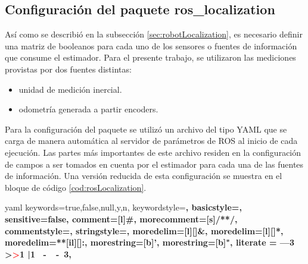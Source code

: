 \subsection{Configuración del paquete ros\_localization}

Así como se describió en la subsección \ref{sec:robotLocalization}, es necesario definir una matriz de booleanos para cada uno de los sensores o fuentes de información que consume el estimador. Para el presente trabajo, se utilizaron las mediciones provistas por dos fuentes distintas:

\begin{itemize}
  \item unidad de medición inercial.
  \item odometría generada a partir encoders.
\end{itemize}

Para la configuración del paquete se utilizó un archivo del tipo YAML que se carga de manera automática al servidor de parámetros de ROS al inicio de cada ejecución. Las partes más importantes de este archivo residen en la configuración de campos a ser tomados en cuenta por el estimador para cada una de las fuentes de información. Una versión reducida de esta configuración se muestra en el bloque de código \ref{cod:rosLocalization}.

\newpage

\newcommand\YAMLcolonstyle{\color{green}\mdseries}
\newcommand\YAMLkeystyle{\color{black}\bfseries}
\newcommand\YAMLvaluestyle{\color{blue}\mdseries}

\makeatletter

\newcommand\language@yaml{yaml}

\expandafter\expandafter\expandafter\lstdefinelanguage
\expandafter{\language@yaml}
{
keywords={true,false,null,y,n},
keywordstyle=\color{darkgray}\bfseries,
basicstyle=\YAMLkeystyle,                                 %
sensitive=false,
comment=[l]{\#},
morecomment=[s]{/*}{*/},
commentstyle=\color{mygreen}\ttfamily,
stringstyle=\YAMLvaluestyle\ttfamily,
moredelim=[l][\color{orange}]{\&},
moredelim=[l][\color{magenta}]{*},
moredelim=**[il][\YAMLcolonstyle{:}\YAMLvaluestyle]{:},   %
morestring=[b]',
morestring=[b]",
literate =    {---}{{\ProcessThreeDashes}}3
{>}{{\textcolor{red}\textgreater}}1
{|}{{\textcolor{red}\textbar}}1
{\ -\ }{{\mdseries\ -\ }}3,
}

